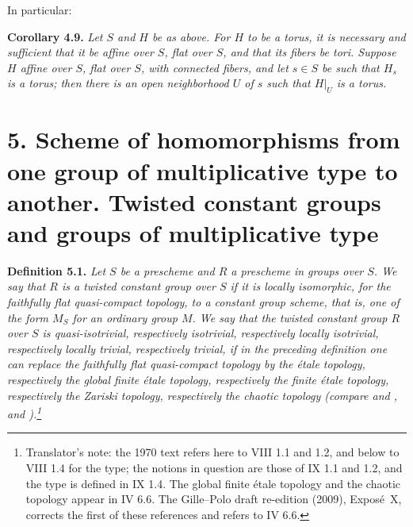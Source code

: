 In particular:

\par\medskip\noindent
\textbf{Corollary 4.9.}\enspace
\begingroup\itshape
Let \(S\) and \(H\) be as above. For \(H\) to be a torus, it is necessary
and sufficient that it be affine over \(S\), flat over \(S\), and that its
fibers be tori. Suppose \(H\) affine over \(S\), flat over \(S\), with
connected fibers, and let \(s\in S\) be such that \(H_s\) is a torus; then
there is an open neighborhood \(U\) of \(s\) such that \(H|_U\) is a torus.
\par\endgroup

\section*{5. Scheme of homomorphisms from one group of multiplicative type to
another. Twisted constant groups and groups of multiplicative type}
{}

\par\medskip\noindent
\textbf{Definition 5.1.}\enspace
\begingroup\itshape
Let \(S\) be a prescheme and \(R\) a prescheme in groups over
\(S\). We say that \(R\) is a \emph{twisted constant group} over \(S\) if
it is locally isomorphic, for the faithfully flat quasi-compact topology,
to a constant group scheme, that is, one of the form \(M_S\) for an
ordinary group \(M\). We say that the twisted constant group \(R\) over
\(S\) is \emph{quasi-isotrivial}, respectively \emph{isotrivial},
respectively \emph{locally isotrivial}, respectively \emph{locally trivial},
respectively \emph{trivial}, if in the preceding definition one can replace
the faithfully flat quasi-compact topology by the étale topology,
respectively the global finite étale topology, respectively the finite
étale topology, respectively the Zariski topology, respectively the chaotic
topology (compare  and , and ).\footnote{Translator's
note: the 1970 text refers here to VIII 1.1 and 1.2, and below to VIII 1.4
for the type; the notions in question are those of IX 1.1 and 1.2, and the
type is defined in IX 1.4. The global finite étale topology and the chaotic
topology appear in IV 6.6. The Gille--Polo draft re-edition (2009),
Expos\'e~X, corrects the first of these references and refers to IV 6.6.}
\par\endgroup

